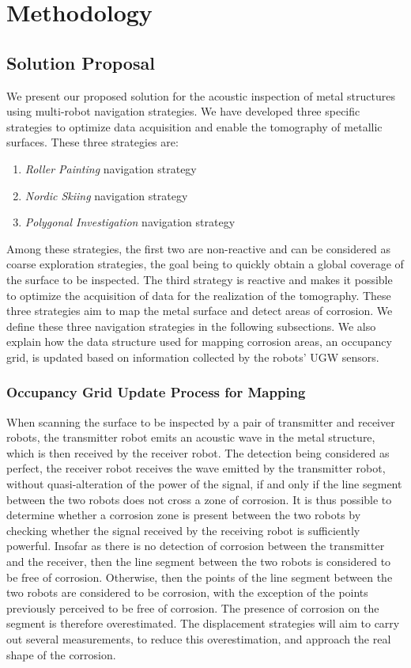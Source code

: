 
\chapter{Methodology}

\section{Solution Proposal}

We present our proposed solution for the acoustic inspection of metal structures using multi-robot navigation strategies.
We have developed three specific strategies to optimize data acquisition and enable the tomography of metallic surfaces.
These three strategies are:
\begin{enumerate}
	\item \textit{Roller Painting} navigation strategy
	\item \textit{Nordic Skiing} navigation strategy
	\item \textit{Polygonal Investigation} navigation strategy
\end{enumerate}
Among these strategies, the first two are non-reactive and can be considered as coarse exploration strategies, the goal being to quickly obtain a global coverage of the surface to be inspected.
The third strategy is reactive and makes it possible to optimize the acquisition of data for the realization of the tomography.
These three strategies aim to map the metal surface and detect areas of corrosion.
We define these three navigation strategies in the following subsections.
We also explain how the data structure used for mapping corrosion areas, an occupancy grid, is updated based on information collected by the robots' UGW sensors.

\subsection{Occupancy Grid Update Process for Mapping}

When scanning the surface to be inspected by a pair of transmitter and receiver robots, the transmitter robot emits an acoustic wave in the metal structure, which is then received by the receiver robot.
The detection being considered as perfect, the receiver robot receives the wave emitted by the transmitter robot, without quasi-alteration of the power of the signal, if and only if the line segment between the two robots does not cross a zone of corrosion.
It is thus possible to determine whether a corrosion zone is present between the two robots by checking whether the signal received by the receiving robot is sufficiently powerful.
Insofar as there is no detection of corrosion between the transmitter and the receiver, then the line segment between the two robots is considered to be free of corrosion.
Otherwise, then the points of the line segment between the two robots are considered to be corrosion, with the exception of the points previously perceived to be free of corrosion.
The presence of corrosion on the segment is therefore overestimated.
The displacement strategies will aim to carry out several measurements, to reduce this overestimation, and approach the real shape of the corrosion.

